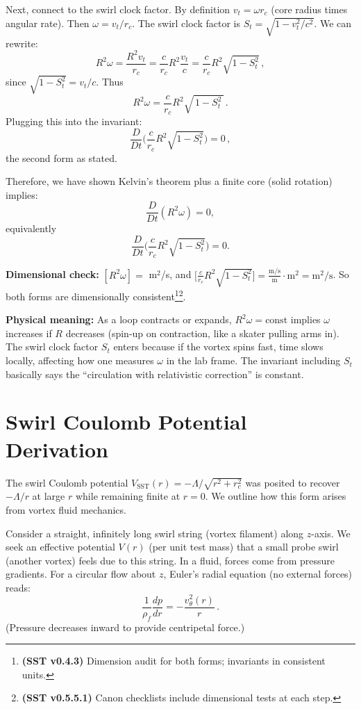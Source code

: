 \documentclass[reprint,aps,onecolumn,nofootinbib]{revtex4-2}
\begin{document}
    Next, connect to the swirl clock factor. By definition $v_t = \omega r_c$ (core radius times angular rate). Then $\omega = v_t/r_c$. The swirl clock factor is $S_t = \sqrt{1 - v_t^2/c^2}$. We can rewrite:
    \[
        R^2 \omega = \frac{R^2 v_t}{r_c} = \frac{c}{r_c} R^2 \frac{v_t}{c} = \frac{c}{r_c} R^2 \sqrt{1 - S_t^2}\,,
    \]
    since $\sqrt{1 - S_t^2} = v_t/c$. Thus
    \[
        R^2 \omega = \frac{c}{r_c} R^2 \sqrt{\,1 - S_t^2\,}\,.
    \]
    Plugging this into the invariant:
    \[
        \frac{D}{Dt}\Big(\frac{c}{r_c} R^2 \sqrt{1 - S_t^2}\Big) = 0\,,
    \]
    the second form as stated.

    Therefore, we have shown Kelvin’s theorem plus a finite core (solid rotation) implies:
    \[
        \frac{D}{Dt}(R^2 \omega) = 0,
    \]
    equivalently
    \[
        \frac{D}{Dt}\Big(\frac{c}{r_c}R^2\sqrt{1 - S_t^2}\Big) = 0.
    \]

    \noindent\textbf{Dimensional check:} $[R^2 \omega] =$ m$^2$/s, and
    $\big[\frac{c}{r_c}R^2\sqrt{1 - S_t^2}\big] = \frac{\text{m/s}}{\text{m}} \cdot \text{m}^2 = \text{m}^2/\text{s}$. So both forms are dimensionally consistent\footnote{\textbf{(SST v0.4.3)} Dimension audit for both forms; invariants in consistent units.}\footnote{\textbf{(SST v0.5.5.1)} Canon checklists include dimensional tests at each step.}.

    \noindent\textbf{Physical meaning:} As a loop contracts or expands, $R^2 \omega = \text{const}$ implies $\omega$ increases if $R$ decreases (spin-up on contraction, like a skater pulling arms in). The swirl clock factor $S_t$ enters because if the vortex spins fast, time slows locally, affecting how one measures $\omega$ in the lab frame. The invariant including $S_t$ basically says the “circulation with relativistic correction” is constant.

\section{Swirl Coulomb Potential Derivation}
    The swirl Coulomb potential $V_{\text{SST}}(r) = -\Lambda/\sqrt{r^2 + r_c^2}$ was posited to recover $- \Lambda/r$ at large $r$ while remaining finite at $r=0$. We outline how this form arises from vortex fluid mechanics.

    Consider a straight, infinitely long swirl string (vortex filament) along $z$-axis. We seek an effective potential $V(r)$ (per unit test mass) that a small probe swirl (another vortex) feels due to this string. In a fluid, forces come from pressure gradients. For a circular flow about $z$, Euler’s radial equation (no external forces) reads:
    \[
        \frac{1}{\rho_f}\frac{dp}{dr} = -\frac{v_{\theta}^2(r)}{r}\,.
    \]
    (Pressure decreases inward to provide centripetal force.)
\end{document}

